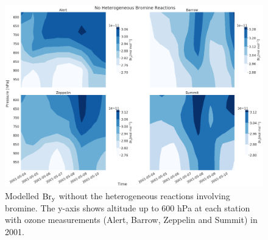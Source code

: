 \begin{figure}
    \centering
    \includegraphics[width = \linewidth]{Chapter6_Results/images/noBr_2001_bry.png}
    \caption{Modelled $\mathrm{Br_y}$ without the heterogeneous reactions involving bromine. The y-axis shows altitude up to 600 hPa at each station with ozone measurements (Alert, Barrow, Zeppelin and Summit) in 2001.}
    \label{fig:vert_noBr_bry_2001}
\end{figure}
